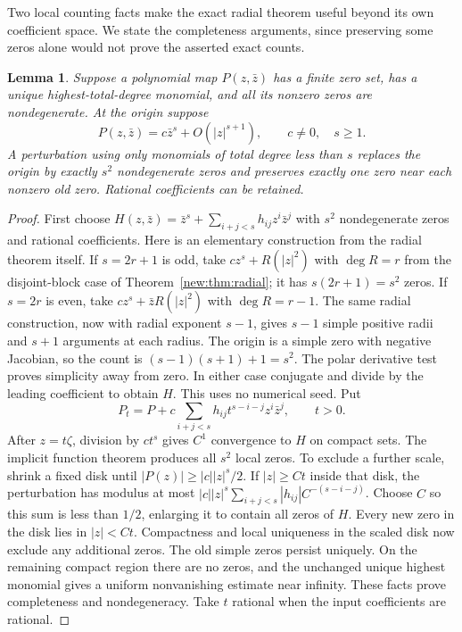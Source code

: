 \documentclass[UTF8,11pt]{ctexart}
\newtheorem{lem}[thm]{Lemma}
\theoremstyle{definition}
\numberwithin{equation}{section}
\begin{document}
Two local counting facts make the exact radial theorem useful beyond
its own coefficient space. We state the completeness arguments, since
preserving some zeros alone would not prove the asserted exact counts.

\begin{lem}\label{new:lem:center}
Suppose a polynomial map $P(z,\bar z)$ has a finite zero set, has a unique
highest-total-degree monomial, and all its nonzero zeros are nondegenerate.
At the origin suppose
\[
 P(z,\bar z)=c\bar z^s+O(|z|^{s+1}),\qquad c\ne0,\quad s\ge1.
\]
A perturbation using only monomials of total degree less than $s$ replaces
the origin by exactly $s^2$ nondegenerate zeros and preserves exactly one
zero near each nonzero old zero. Rational coefficients can be retained.
\end{lem}
\begin{proof}
First choose $H(z,\bar z)=\bar z^s+\sum_{i+j<s}h_{ij}z^i\bar z^j$ with
$s^2$ nondegenerate zeros and rational coefficients. Here is an elementary
construction from the radial theorem itself. If $s=2r+1$ is odd, take
$cz^s+R(|z|^2)$ with $\deg R=r$ from the disjoint-block case of
Theorem~\ref{new:thm:radial}; it has $s(2r+1)=s^2$ zeros. If $s=2r$
is even, take $cz^s+\bar zR(|z|^2)$ with $\deg R=r-1$. The same radial
construction, now with radial exponent $s-1$, gives $s-1$ simple
positive radii and $s+1$ arguments at each radius. The origin is a
simple zero with negative Jacobian, so the count is
$(s-1)(s+1)+1=s^2$. The polar derivative test proves simplicity away
from zero. In either case conjugate and divide by the leading
coefficient to obtain $H$. This uses no numerical seed. Put
\[
 P_t=P+c\sum_{i+j<s}h_{ij}t^{s-i-j}z^i\bar z^j,\qquad t>0.
\]
After $z=t\zeta$, division by $ct^s$ gives $C^1$ convergence to $H$ on
compact sets. The implicit function theorem produces all $s^2$ local
zeros. To exclude a further scale, shrink a fixed disk until
$|P(z)|\ge |c||z|^s/2$. If $|z|\ge Ct$ inside that disk, the perturbation
has modulus at most
$|c||z|^s\sum_{i+j<s}|h_{ij}|C^{-(s-i-j)}$.
Choose $C$ so this sum is less than $1/2$, enlarging it to contain all
zeros of $H$. Every new zero in the disk lies in $|z|<Ct$.
Compactness and local uniqueness in the scaled disk now exclude any
additional zeros. The old simple zeros persist uniquely. On the
remaining compact region there are no zeros, and the unchanged unique
highest monomial gives a uniform nonvanishing estimate near infinity.
These facts prove completeness and nondegeneracy. Take $t$ rational
when the input coefficients are rational.
\end{proof}
\end{document}
